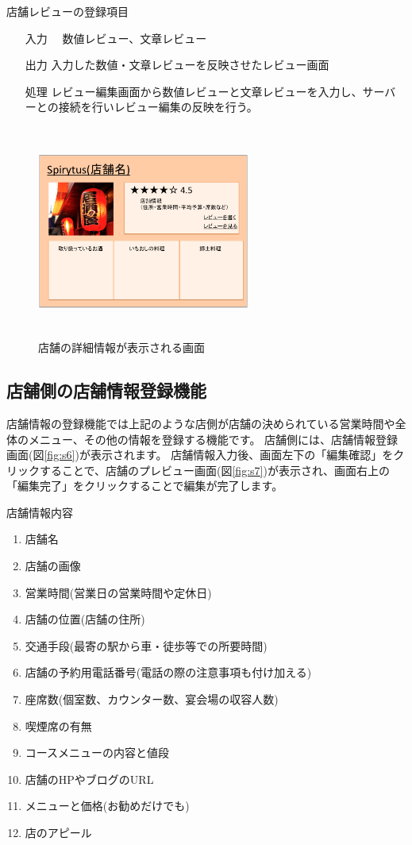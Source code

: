 \documentclass[a4j,titlepage]{jarticle}
\begin{document}
店舗レビューの登録項目
\begin{enumerate}
  \item [入力]　数値レビュー、文章レビュー
  \item [出力]  入力した数値・文章レビューを反映させたレビュー画面
  \item [処理]  レビュー編集画面から数値レビューと文章レビューを入力し、サーバーとの接続を行いレビュー編集の反映を行う。
\end{enumerate}

\begin {figure}[htbp]
    \begin{center}
    \includegraphics [height=7cm, width=7cm]{extrnal_design_document_image/17.eps}
    \caption {店舗の詳細情報が表示される画面}
    \label {fig:17}
    \end{center}
\end {figure}

\subsection{店舗側の店舗情報登録機能}
店舗情報の登録機能では上記のような店側が店舗の決められている営業時間や全体のメニュー、その他の情報を登録する機能です。
店舗側には、店舗情報登録画面(図\ref{fig:s6})が表示されます。
店舗情報入力後、画面左下の「編集確認」をクリックすることで、店舗のプレビュー画面(図\ref{fig:s7})が表示され、画面右上の「編集完了」をクリックすることで編集が完了します。

店舗情報内容
\begin{enumerate}
\item 店舗名
\item 店舗の画像
\item 営業時間(営業日の営業時間や定休日)
\item 店舗の位置(店舗の住所)
\item 交通手段(最寄の駅から車・徒歩等での所要時間)
\item 店舗の予約用電話番号(電話の際の注意事項も付け加える)
\item 座席数(個室数、カウンター数、宴会場の収容人数)
\item 喫煙席の有無
\item コースメニューの内容と値段
\item 店舗のHPやブログのURL
\item メニューと価格(お勧めだけでも)
\item 店のアピール
\end{enumerate}
\end{document}
